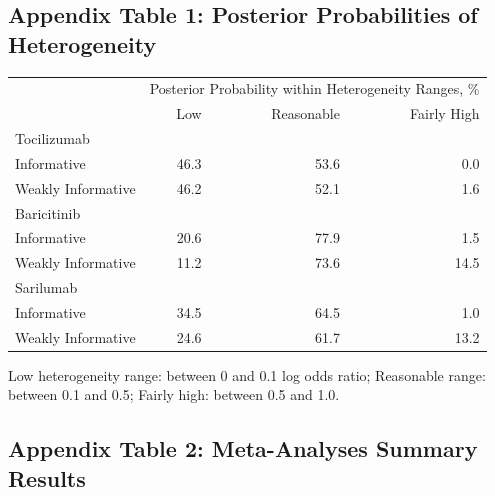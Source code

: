 \documentclass[
  12pt,
]{article}
\begin{document}
\newpage

\hypertarget{appendix-table-1-posterior-probabilities-of-heterogeneity}{%
\subsection{Appendix Table 1: Posterior Probabilities of
Heterogeneity}\label{appendix-table-1-posterior-probabilities-of-heterogeneity}}

\captionsetup[table]{labelformat=empty,skip=1pt}
\begin{longtable}{lrrr}
\toprule
 & \multicolumn{3}{c}{Posterior Probability within Heterogeneity Ranges, \%} \\ 
 \cmidrule(lr){2-4}
 & Low & Reasonable & Fairly High \\ 
\midrule
\multicolumn{1}{l}{Tocilizumab} \\ 
\midrule
Informative & 46.3 & 53.6 & 0.0 \\ 
Weakly Informative & 46.2 & 52.1 & 1.6 \\ 
\midrule
\multicolumn{1}{l}{Baricitinib} \\ 
\midrule
Informative & 20.6 & 77.9 & 1.5 \\ 
Weakly Informative & 11.2 & 73.6 & 14.5 \\ 
\midrule
\multicolumn{1}{l}{Sarilumab} \\ 
\midrule
Informative & 34.5 & 64.5 & 1.0 \\ 
Weakly Informative & 24.6 & 61.7 & 13.2 \\ 
 \bottomrule
\end{longtable}
\begin{minipage}{\linewidth}
Low heterogeneity range: between 0 and 0.1 log odds ratio; Reasonable range: between 0.1 and 0.5; Fairly high: between 0.5 and 1.0.\\ 
\end{minipage}

\newpage

\hypertarget{appendix-table-2-meta-analyses-summary-results}{%
\subsection{Appendix Table 2: Meta-Analyses Summary
Results}\label{appendix-table-2-meta-analyses-summary-results}}
\end{document}
